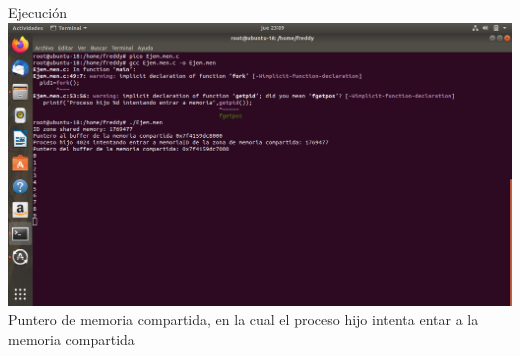 \documentclass[11pt,a4paper]{report}
\begin{document}
Ejecuci\'on\\
\includegraphics[scale=0.3]{ejem0.png}  
\\
Puntero de memoria compartida, en la cual el proceso hijo intenta entar a la memoria compartida
\clearpage
\end{document}
